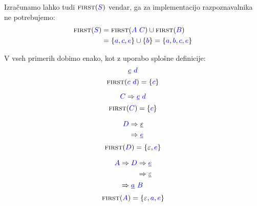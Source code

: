 \documentclass{article}
\newcommand{\FIRST}{\textsc{first}}
\newcommand{\Symbol}[1]{\textcolor{blue}{#1}}
\newcommand{\Null}{\varepsilon}
\newcommand{\Derive}{\Rightarrow}
\newcommand{\Seq}{\ }
\begin{document}
Izračunamo lahko tudi $\FIRST(\Symbol{S})$ vendar, ga za implementacijo razpoznavalnika ne potrebujemo:
\begin{align*}
  \FIRST(\Symbol{S}) &= \FIRST(\Symbol{A} \Seq \Symbol{C}) \cup \FIRST(\Symbol{B}) \\
            &= \{\Symbol{a}, \Symbol{c}, \Symbol{e}\} \cup \{\Symbol{b}\} = \{\Symbol{a}, \Symbol{b}, \Symbol{c}, \Symbol{e}\}
\end{align*}

V vseh primerih dobimo enako, kot z uporabo splošne definicije:
\begin{equation*}
  \underline{\Symbol{c}} \Seq \Symbol{d}
\end{equation*}
\begin{equation*}
  \FIRST(\Symbol{c} \Seq \Symbol{d}) = \{\Symbol{c}\}
\end{equation*}

\begin{equation*}
  \Symbol{C} \Derive \underline{\Symbol{c}} \Seq \Symbol{d}
\end{equation*}
\begin{equation*}
  \FIRST(\Symbol{C}) = \{\Symbol{c}\}
\end{equation*}

\begin{equation*}
  \Symbol{D} \begin{aligned}[t]
    &\Derive \underline{\Null}\\
    &\Derive \underline{\Symbol{e}}\\
  \end{aligned}
\end{equation*}
\begin{equation*}
  \FIRST(\Symbol{D}) = \{\Null, \Symbol{e}\}
\end{equation*}

\begin{equation*}
  \Symbol{A} \begin{aligned}[t]
    &\Derive \Symbol{D} \begin{aligned}[t]
      &\Derive \underline{\Symbol{e}} \\
      &\Derive \underline{\Null}\\
    \end{aligned}\\
    &\Derive \underline{\Symbol{a}} \Seq \Symbol{B}
  \end{aligned}
\end{equation*}
\begin{equation*}
  \FIRST(\Symbol{A}) = \{\Null, \Symbol{a}, \Symbol{e}\}
\end{equation*}
\end{document}
